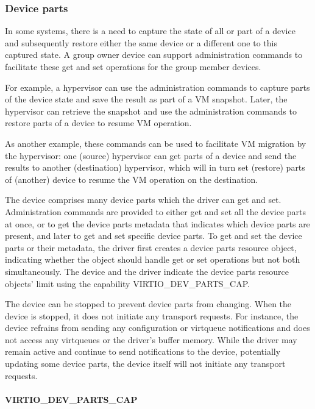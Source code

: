 \subsubsection{Device parts}\label{sec:Basic Facilities of a Virtio Device / Device groups / Group administration commands / Device parts}

In some systems, there is a need to capture the state of all or part of
a device and subsequently restore either the same device or a
different one to this captured state. A group owner device can support
administration commands to facilitate these get and set operations for
the group member devices.

For example, a hypervisor can use the administration commands to
capture parts of the device state and save the result as part of
a VM snapshot. Later, the hypervisor can retrieve the snapshot and use the
administration commands to restore parts of a device to resume
VM operation.

As another example, these commands can be used to facilitate VM migration by the
hypervisor: one (source) hypervisor can get parts of a device and send
the results to another (destination) hypervisor, which will in turn
set (restore) parts of (another) device to resume the VM operation on
the destination.

The device comprises many device parts which the driver can get and set.
Administration commands are provided to either get and set all the device
parts at once, or to get the device parts metadata that indicates which
device parts are present, and later to get and set specific device parts.
To get and set the device parts or their metadata, the driver first creates a
device parts resource object, indicating whether the object should
handle get or set operations but not both simultaneously. The device and the
driver indicate the device parts resource objects' limit using the capability
VIRTIO_DEV_PARTS_CAP.

The device can be stopped to prevent device parts from changing.
When the device is stopped, it does not initiate any transport requests.
For instance, the device refrains from sending any configuration or
virtqueue notifications and does not access any virtqueues or the driver's
buffer memory. While the driver may remain active and continue to send
notifications to the device, potentially updating some device parts,
the device itself will not initiate any transport requests.

\paragraph{VIRTIO_DEV_PARTS_CAP}
\label{par:Basic Facilities of a Virtio Device / Device groups / Group administration commands / Device parts / VIRTIO-DEV-PARTS-CAP}

